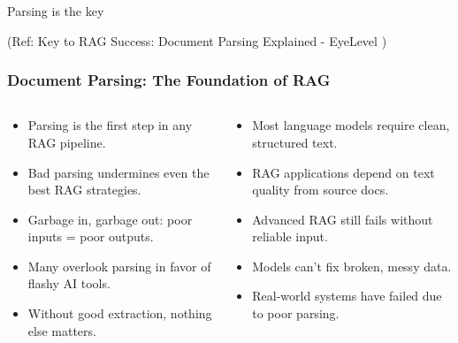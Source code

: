 \begin{frame}[fragile]\frametitle{}
\begin{center}
{\Large Parsing is the key}

{\tiny (Ref: Key to RAG Success: Document Parsing Explained - EyeLevel )}
\end{center}
\end{frame}

\begin{frame}[fragile]\frametitle{Document Parsing: The Foundation of RAG}

\begin{columns}
    \begin{column}[T]{0.5\linewidth}
	  \begin{itemize}
		\item Parsing is the first step in any RAG pipeline.
		\item Bad parsing undermines even the best RAG strategies.
		\item Garbage in, garbage out: poor inputs = poor outputs.
		\item Many overlook parsing in favor of flashy AI tools.
		\item Without good extraction, nothing else matters.
	  \end{itemize}

    \end{column}
    \begin{column}[T]{0.5\linewidth}
	  \begin{itemize}
		\item Most language models require clean, structured text.
		\item RAG applications depend on text quality from source docs.
		\item Advanced RAG still fails without reliable input.
		\item Models can't fix broken, messy data.
		\item Real-world systems have failed due to poor parsing.
	  \end{itemize}
    \end{column}
  \end{columns}
  

\end{frame}

